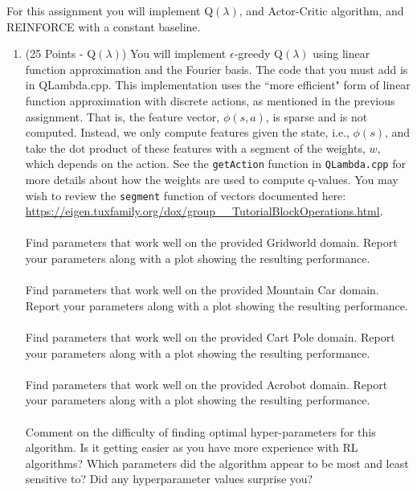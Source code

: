 \documentclass{article}
\begin{document}
For this assignment you will implement Q$(\lambda)$, and Actor-Critic algorithm, and REINFORCE with a constant baseline.

\begin{enumerate}
    \item (25 Points - Q$(\lambda)$) You will implement $\epsilon$-greedy Q$(\lambda)$ using linear function approximation and the Fourier basis. The code that you must add is in QLambda.cpp. This implementation uses the ``more efficient" form of linear function approximation with discrete actions, as mentioned in the previous assignment. That is, the feature vector, $\phi(s,a)$, is sparse and is not computed. Instead, we only compute features given the state, i.e., $\phi(s)$, and take the dot product of these features with a segment of the weights, $w$, which depends on the action. See the \texttt{getAction} function in \texttt{QLambda.cpp} for more details about how the weights are used to compute q-values. You may wish to review the \texttt{segment} function of vectors documented here: \url{https://eigen.tuxfamily.org/dox/group__TutorialBlockOperations.html}.
    \\\\
     Find parameters that work well on the provided Gridworld domain. Report your parameters along with a plot showing the resulting performance.
    \\\\
     Find parameters that work well on the provided Mountain Car domain. Report your parameters along with a plot showing the resulting performance.
    \\\\
     Find parameters that work well on the provided Cart Pole domain. Report your parameters along with a plot showing the resulting performance.
    \\\\
     Find parameters that work well on the provided Acrobot domain. Report your parameters along with a plot showing the resulting performance.
    \\\\
     Comment on the difficulty of finding optimal hyper-parameters for this algorithm. Is it getting easier as you have more experience with RL algorithms? Which parameters did the algorithm appear to be most and least sensitive to? Did any hyperparameter values surprise you?
    \\\\

\end{enumerate}
\end{document}
